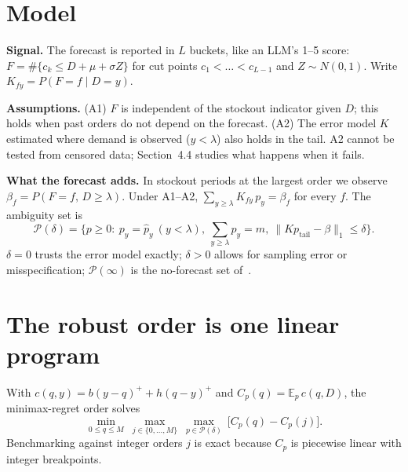 \documentclass[10pt]{article}
\newcommand{\E}{\mathbb{E}}
\begin{document}
\section{Model}
\textbf{Signal.} The forecast is reported in $L$ buckets, like an LLM's 1--5 score: $F=\#\{c_k\le D+\mu+\sigma Z\}$ for cut points $c_1<\dots<c_{L-1}$ and $Z\sim N(0,1)$. Write $K_{fy}=P(F=f\mid D=y)$.

\textbf{Assumptions.} (A1) $F$ is independent of the stockout indicator given $D$; this holds when past orders do not depend on the forecast. (A2) The error model $K$ estimated where demand is observed ($y<\lambda$) also holds in the tail. A2 cannot be tested from censored data; Section~4.4 studies what happens when it fails.

\textbf{What the forecast adds.} In stockout periods at the largest order we observe $\beta_f=P(F=f,\,D\ge\lambda)$. Under A1--A2, $\sum_{y\ge\lambda}K_{fy}\,p_y=\beta_f$ for every $f$. The ambiguity set is
\begin{equation}
\mathcal{P}(\delta)=\Big\{p\ge 0:\ p_y=\hat p_y\ (y<\lambda),\ \textstyle\sum_{y\ge\lambda}p_y=m,\ \big\|K p_{\text{tail}}-\beta\big\|_1\le\delta\Big\}.
\end{equation}
$\delta=0$ trusts the error model exactly; $\delta>0$ allows for sampling error or misspecification; $\mathcal{P}(\infty)$ is the no-forecast set of~\cite{hs}.

\section{The robust order is one linear program}
With $c(q,y)=b(y-q)^++h(q-y)^+$ and $C_p(q)=\E_p\,c(q,D)$, the minimax-regret order solves
\begin{equation}
\min_{0\le q\le M}\ \max_{j\in\{0,\dots,M\}}\ \max_{p\in\mathcal{P}(\delta)}\ \big[C_p(q)-C_p(j)\big].
\end{equation}
Benchmarking against integer orders $j$ is exact because $C_p$ is piecewise linear with integer breakpoints.
\end{document}
